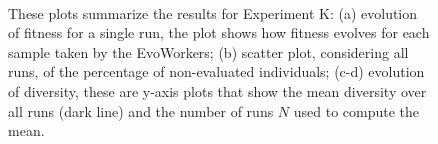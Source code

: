 \begin{figure}[t]
    \centering
    \\
    \caption{
    These plots summarize the results for Experiment K:
    (a) evolution of fitness for a single run, the plot shows how fitness evolves for each sample taken by the EvoWorkers;
    (b) scatter plot, considering all runs, of the percentage of non-evaluated individuals;
    (c-d) evolution of diversity, these are y-axis plots that show the mean diversity over all runs (dark line) and the number of runs $N$ used to compute the mean.}
    \label{fig:others}
\end{figure}

